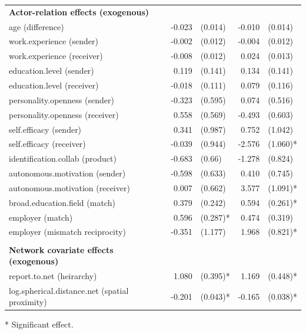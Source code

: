 \begin{table}[]
\begin{threeparttable}
\begin{tabular}{@{}lrlrl@{}}
			\textbf{Actor-relation effects (exogenous)}     &         	&          	&       	&         	\\
			age (difference) 								& -0.023  	& (0.014)  	& -0.010	& (0.014) 	\\
			work.experience (sender)                        & -0.002  	& (0.012)  	& -0.004	& (0.012) 	\\
			work.experience (receiver)                      & -0.008  	& (0.012)  	& 0.024 	& (0.013) 	\\
			education.level (sender)                        & 0.119   	& (0.141)  	& 0.134 	& (0.141) 	\\
			education.level (receiver)                      & -0.018  	& (0.111)  	& 0.079 	& (0.116) 	\\
			personality.openness (sender)                   & -0.323  	& (0.595)  	& 0.074 	& (0.516) 	\\
			personality.openness (receiver)                 & 0.558   	& (0.569)  	& -0.493	& (0.603) 	\\
			self.efficacy (sender)                          & 0.341   	& (0.987)  	& 0.752 	& (1.042) 	\\
			self.efficacy (receiver)                        & -0.039  	& (0.944)  	& -2.576	& (1.060)* 	\\
			identification.collab (product)                 & -0.683  	& (0.66)   	& -1.278	& (0.824) 	\\
			autonomous.motivation (sender)                  & -0.598  	& (0.633)  	& 0.410 	& (0.745) 	\\
			autonomous.motivation (receiver)                & 0.007   	& (0.662)  	& 3.577 	& (1.091)*	\\
			broad.education.field (match)                   & 0.379   	& (0.242)  	& 0.594 	& (0.261)*	\\
			employer (match) 								& 0.596   	& (0.287)* 	& 0.474 	& (0.319) 	\\
			employer (mismatch reciprocity)                 & -0.351  	& (1.177)  	& 1.968 	& (0.821)*	\\
															&         	&          	&       	&         	\\
			\textbf{Network covariate effects (exogenous)}  &         	&          	&       	&         	\\
			report.to.net (heirarchy)                       & 1.080   	& (0.395)* 	& 1.169 	& (0.448)*	\\
			log.spherical.distance.net (spatial proximity)  & -0.201  	& (0.043)* 	& -0.165	& (0.038)*	\\ \bottomrule
		\end{tabular}
		\begin{tablenotes}
			\small
			\item [*] Significant effect.
		\end{tablenotes}
	\end{threeparttable}
\end{table}


